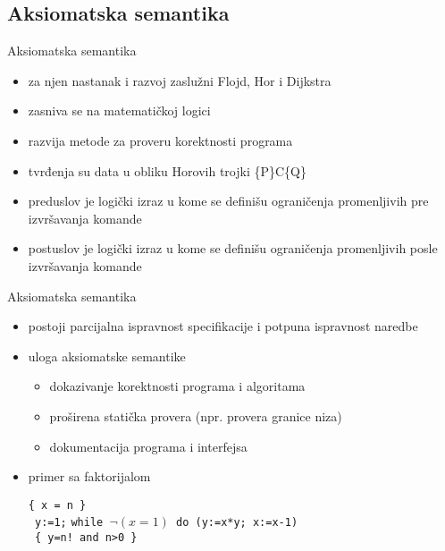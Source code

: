 \documentclass{beamer}
\begin{document}
\subsection{Aksiomatska semantika}
\begin{frame}{Aksiomatska semantika}
  \begin{itemize}
  \item za njen nastanak i razvoj zaslužni Flojd, Hor i Dijkstra
  \item zasniva se na matematičkoj logici
  \item razvija metode za proveru korektnosti programa
   \item tvrđenja su data u obliku Horovih trojki \{P\}C\{Q\}
   \item preduslov je logički izraz u kome se definišu ograničenja promenljivih pre izvršavanja komande
   \item postuslov je logički izraz u kome se definišu ograničenja promenljivih posle izvršavanja komande
  \end{itemize}
\end{frame}

\begin{frame}{Aksiomatska semantika}
 \begin{itemize}
  \item postoji parcijalna ispravnost specifikacije i potpuna ispravnost naredbe
  \item uloga aksiomatske semantike
  \begin{itemize}
  \item dokazivanje korektnosti programa i algoritama
   \item proširena statička provera (npr. provera granice niza)
   \item dokumentacija programa i interfejsa
    \end{itemize} 
    \item primer sa faktorijalom
  \begin{tcolorbox}
  \begin{center}


\texttt{\{ x = n \}}   \\
\texttt{ y:=1;} 
 \texttt{while $ \neg(x=1) $   do  (y:=x*y; x:=x-1) }\\
\texttt{ \{ y=n! and  n>0 \}  } \\
\end{center}
\end{tcolorbox}
  \end{itemize} 
\end{frame}
\end{document}
